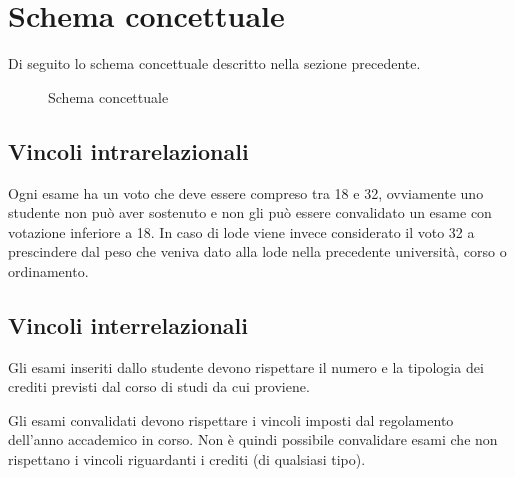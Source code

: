 \section{Schema concettuale}
Di seguito lo schema concettuale descritto nella sezione
precedente.

\begin{figure}[!ht]
	\centering
	
	\caption{Schema concettuale}
\end{figure}

\subsection{Vincoli intrarelazionali}
Ogni esame ha un voto che deve essere compreso tra 18 e 32,
ovviamente uno studente non può aver sostenuto e non gli può
essere convalidato un esame con votazione inferiore a 18. In
caso di lode viene invece considerato il voto 32 a prescindere
dal peso che veniva dato alla lode nella precedente università,
corso o ordinamento.

\subsection{Vincoli interrelazionali}
Gli esami inseriti dallo studente devono rispettare il numero
e la tipologia dei crediti previsti dal corso di studi da cui
proviene.

Gli esami convalidati devono rispettare i vincoli imposti dal
regolamento dell'anno accademico in corso. Non è quindi
possibile convalidare esami che non rispettano i vincoli
riguardanti i crediti (di qualsiasi tipo).
